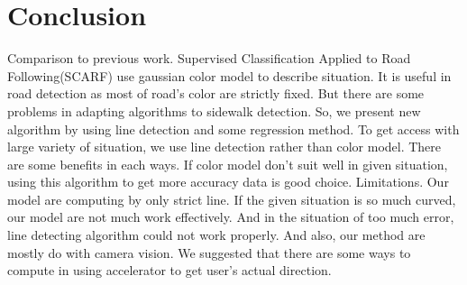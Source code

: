 \section{Conclusion}
Comparison to previous work. 
Supervised Classification Applied to Road Following(SCARF) use gaussian color model to describe situation. It is useful in road detection as most of road's color are strictly fixed. But there are some problems in adapting algorithms to sidewalk detection. So, we present new algorithm by using line detection and some regression method. To get access with large variety of situation, we use line detection rather than color model. There are some benefits in each ways. If color model don't suit well in given situation, using this algorithm to get more accuracy data is good choice. 
Limitations. Our model are computing by only strict line. If the given situation is so much curved, our model are not much work effectively. And in the situation of too much error, line detecting algorithm could not work properly. And also, our method are mostly do with camera vision. We suggested that there are some ways to compute in using accelerator to get user's actual direction. 
\label{sec:conclusion}